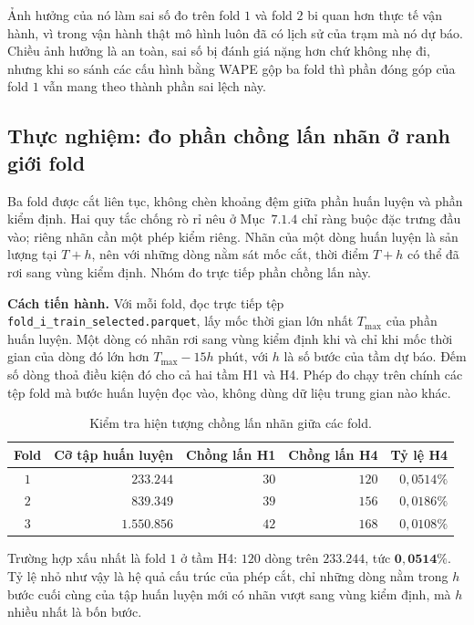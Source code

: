 \documentclass[12pt, a4paper]{report}
\begin{document}
Ảnh hưởng của nó làm sai số đo trên fold $1$ và fold $2$ bi quan hơn thực tế vận
hành, vì trong vận hành thật mô hình luôn đã có lịch sử của trạm mà nó dự báo. Chiều ảnh
hưởng là an toàn, sai số bị đánh giá nặng hơn chứ không nhẹ đi, nhưng khi so sánh các
cấu hình bằng WAPE gộp ba fold thì phần đóng góp của fold $1$ vẫn mang theo thành phần sai
lệch này.

\FloatBarrier
\subsection{Thực nghiệm: đo phần chồng lấn nhãn ở ranh giới fold}

Ba fold được cắt liên tục, không chèn khoảng đệm giữa phần huấn luyện và phần kiểm
định. Hai quy tắc chống rò rỉ nêu ở Mục~$7.1.4$ chỉ ràng buộc đặc trưng đầu
vào; riêng nhãn cần một phép kiểm riêng. Nhãn của một dòng huấn luyện là sản
lượng tại $T + h$, nên với những dòng nằm sát mốc cắt, thời điểm $T + h$ có thể đã rơi
sang vùng kiểm định. Nhóm đo trực tiếp phần chồng lấn này.

\textbf{Cách tiến hành.} Với mỗi fold, đọc trực tiếp tệp
\texttt{fold\_i\_train\_selected.parquet}, lấy mốc thời gian lớn nhất $T_{\max}$ của phần
huấn luyện. Một dòng có nhãn rơi sang vùng kiểm định khi và chỉ khi mốc thời gian của dòng đó lớn hơn
$T_{\max} - 15h$ phút, với $h$ là số bước của tầm dự báo. Đếm số dòng thoả điều kiện đó
cho cả hai tầm H1 và H4. Phép đo chạy trên chính các tệp fold mà bước huấn luyện đọc
vào, không dùng dữ liệu trung gian nào khác.

\begin{table}[htbp]
\centering
\caption{Kiểm tra hiện tượng chồng lấn nhãn giữa các fold.}
\label{tab:chong_lan}
\small
\begin{tabular}{c r r r r}
\toprule
\textbf{Fold} & \textbf{Cỡ tập huấn luyện} & \textbf{Chồng lấn H1} & \textbf{Chồng lấn H4} & \textbf{Tỷ lệ H4} \\
\midrule
$1$ & $233.244$ & $30$ & $120$ & $0{,}0514\%$ \\
$2$ & $839.349$ & $39$ & $156$ & $0{,}0186\%$ \\
$3$ & $1.550.856$ & $42$ & $168$ & $0{,}0108\%$ \\
\bottomrule
\end{tabular}
\end{table}

Trường hợp xấu nhất là fold $1$ ở tầm H4: $120$ dòng trên $233.244$, tức
$\mathbf{0{,}0514\%}$. Tỷ lệ nhỏ như vậy là hệ quả cấu trúc của phép cắt, chỉ những dòng
nằm trong $h$ bước cuối cùng của tập huấn luyện mới có nhãn vượt sang vùng kiểm định, mà
$h$ nhiều nhất là bốn bước.
\end{document}
